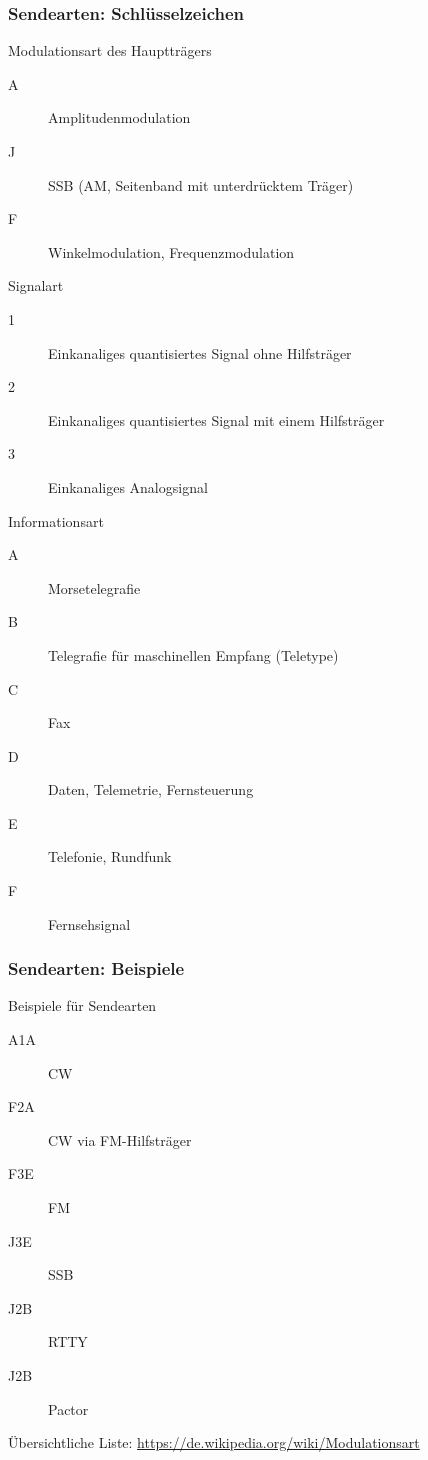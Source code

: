 \begin{frame}[allowframebreaks]
    \frametitle{Sendearten: Schlüsselzeichen}

    \begin{block}{Modulationsart des Hauptträgers}
    \begin{description}
      \item[A] Amplitudenmodulation
      \item[J] SSB (AM, Seitenband mit unterdrücktem Träger)
      \item[F] Winkelmodulation, Frequenzmodulation
    \end{description}
    \end{block}

    \begin{block}{Signalart}
    \begin{description}
      \item[1] Einkanaliges quantisiertes Signal ohne Hilfsträger
      \item[2] Einkanaliges quantisiertes Signal mit einem Hilfsträger
      \item[3] Einkanaliges Analogsignal
    \end{description}
    \end{block}

    \begin{block}{Informationsart}
    \begin{description}
      \item[A] Morsetelegrafie
      \item[B] Telegrafie für maschinellen Empfang (Teletype)
      \item[C] Fax
      \item[D] Daten, Telemetrie, Fernsteuerung
      \item[E] Telefonie, Rundfunk
      \item[F] Fernsehsignal
    \end{description}
    \end{block}

\end{frame}

\begin{frame}
    \frametitle{Sendearten: Beispiele}

    \begin{exampleblock}{Beispiele für Sendearten}
    \begin{description}
        \item[A1A] CW
        \item[F2A] CW via FM-Hilfsträger
        \item[F3E] FM
        \item[J3E] SSB
        \item[J2B] RTTY
        \item[J2B] Pactor
    \end{description}
    \end{exampleblock}

    Übersichtliche Liste: \url{https://de.wikipedia.org/wiki/Modulationsart}

\end{frame}

